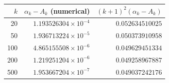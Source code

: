 \begin{center}
\begin{tabular}{rrr}
\toprule
$k$ & $\alpha_k-A_k$ (numerical) & $(k+1)^2(\alpha_k-A_k)$\\
\midrule
20 & $1.193526304\times10^{-4}$ & $0.052634510025$\\
50 & $1.936713224\times10^{-5}$ & $0.050373910958$\\
100 & $4.865155508\times10^{-6}$ & $0.049629451334$\\
200 & $1.219251204\times10^{-6}$ & $0.049258967887$\\
500 & $1.953667204\times10^{-7}$ & $0.049037242176$\\
\bottomrule
\end{tabular}
\end{center}

